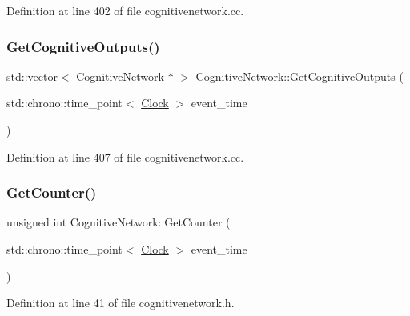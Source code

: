 Definition at line 402 of file cognitivenetwork.\+cc.

\mbox{\label{class_cognitive_network_acdf847165899c36d6d9d6843ecc27218}} 
\subsubsection{\texorpdfstring{Get\+Cognitive\+Outputs()}{GetCognitiveOutputs()}}
{\footnotesize\ttfamily std\+::vector$<$ \mbox{\hyperlink{class_cognitive_network}{Cognitive\+Network}} $\ast$ $>$ Cognitive\+Network\+::\+Get\+Cognitive\+Outputs (\begin{DoxyParamCaption}\item[{std\+::chrono\+::time\+\_\+point$<$ \mbox{\hyperlink{universe_8h_a0ef8d951d1ca5ab3cfaf7ab4c7a6fd80}{Clock}} $>$}]{event\+\_\+time }\end{DoxyParamCaption})}



Definition at line 407 of file cognitivenetwork.\+cc.

\mbox{\label{class_cognitive_network_a160bb447671609eb14b1b8043639ac74}} 
\subsubsection{\texorpdfstring{Get\+Counter()}{GetCounter()}}
{\footnotesize\ttfamily unsigned int Cognitive\+Network\+::\+Get\+Counter (\begin{DoxyParamCaption}\item[{std\+::chrono\+::time\+\_\+point$<$ \mbox{\hyperlink{universe_8h_a0ef8d951d1ca5ab3cfaf7ab4c7a6fd80}{Clock}} $>$}]{event\+\_\+time }\end{DoxyParamCaption})\hspace{0.3cm}{\ttfamily [inline]}}



Definition at line 41 of file cognitivenetwork.\+h.

\mbox{\label{class_cognitive_network_aa64c93ecec84b57b25e1fdb173795f9b}} 
